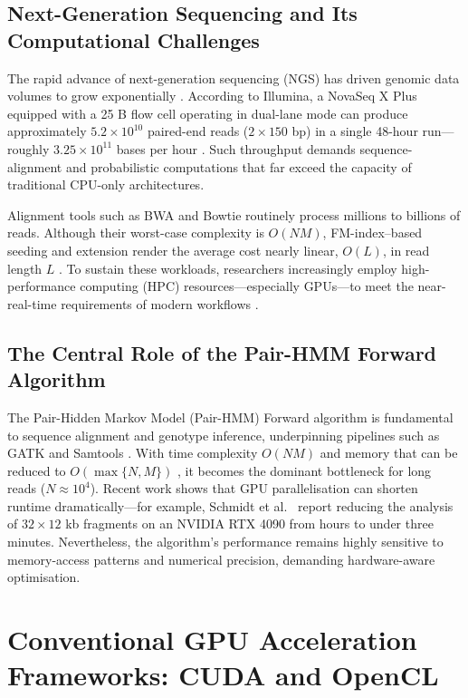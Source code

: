 \documentclass[PhD]{PHlab-thesis}
\begin{document}
\subsection{Next-Generation Sequencing and Its Computational Challenges}
The rapid advance of next-generation sequencing (NGS) has driven genomic data volumes to grow exponentially \cite{Mardis2017}. According to Illumina, a NovaSeq X Plus equipped with a 25 B flow cell operating in dual-lane mode can produce approximately $5.2\times10^{10}$ paired-end reads ($2\times150$ bp) in a single 48-hour run—roughly $3.25\times10^{11}$ bases per hour \cite{Illumina2024-novaseqx}. Such throughput demands sequence-alignment and probabilistic computations that far exceed the capacity of traditional CPU-only architectures.

Alignment tools such as BWA \cite{LiDurbin2010} and Bowtie \cite{Langmead2009} routinely process millions to billions of reads. Although their worst-case complexity is $O(NM)$, FM-index–based seeding and extension render the average cost nearly linear, $O(L)$, in read length $L$ \cite{Ferragina2000}. To sustain these workloads, researchers increasingly employ high-performance computing (HPC) resources—especially GPUs—to meet the near-real-time requirements of modern workflows \cite{Liu2021-bib}.

\subsection{The Central Role of the Pair-HMM Forward Algorithm}
The Pair-Hidden Markov Model (Pair-HMM) Forward algorithm is fundamental to sequence alignment and genotype inference, underpinning pipelines such as GATK \cite{McKenna2010} and Samtools \cite{Li2009}. With time complexity $O(NM)$ and memory that can be reduced to $O(\max\{N,M\})$ \cite{Durbin1998,Banerjee2017}, it becomes the dominant bottleneck for long reads ($N\approx10^{4}$). Recent work shows that GPU parallelisation can shorten runtime dramatically—for example, Schmidt et al.\ \cite{Schmidt2024-gpuPairHMM} report reducing the analysis of $32\times12$ kb fragments on an NVIDIA RTX 4090 from hours to under three minutes. Nevertheless, the algorithm's performance remains highly sensitive to memory-access patterns and numerical precision, demanding hardware-aware optimisation.

\section{Conventional GPU Acceleration Frameworks: CUDA and OpenCL}
\end{document}
